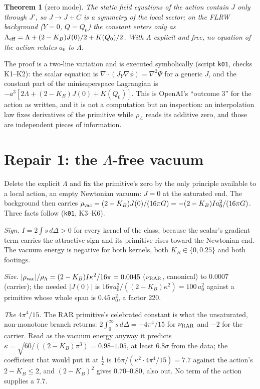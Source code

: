 \documentclass[11pt,letterpaper]{article}
\newtheorem{theorem}{Theorem}
\begin{document}
\begin{theorem}[zero mode]
The static field equations of the action contain $J$ only through $J'$, so $J\to J+C$ is a symmetry of the local sector; on the FLRW background ($Y=0$, $Q=Q_0$) the constant enters only as $\Lambda_{\rm eff}=\Lambda+(2-K_B)J(0)/2+K(Q_0)/2$. With $\Lambda$ explicit and free, no equation of the action relates $a_0$ to $\Lambda$.
\end{theorem}
The proof is a two-line variation and is executed symbolically (script \texttt{k01}, checks K1--K2): the scalar equation is $\nabla\!\cdot\!(J_Y\nabla\phi)=\nabla^2\Psi$ for a generic $J$, and the constant part of the minisuperspace Lagrangian is $-a^3[2\Lambda+(2-K_B)J(0)+K(Q_0)]$. This is OpenAI's ``outcome 3'' for the action as written, and it is not a computation but an inspection: an interpolation law fixes derivatives of the primitive while $\rho_\Lambda$ reads its additive zero, and those are independent pieces of information.

\section{Repair 1: the $\Lambda$-free vacuum}
Delete the explicit $\Lambda$ and fix the primitive's zero by the only principle available to a local action, an empty Newtonian vacuum: $J=0$ at the saturated end. The background then carries $\rho_{\rm vac}=(2-K_B)J(0)/(16\pi G)=-(2-K_B)Ia_0^2/(16\pi G)$. Three facts follow (\texttt{k01}, K3--K6).

\emph{Sign.} $I=2\int s\,d\Delta>0$ for every kernel of the class, because the scalar's gradient term carries the attractive sign and its primitive rises toward the Newtonian end. The vacuum energy is negative for both kernels, both $K_B\in\{0,0.25\}$ and both footings.

\emph{Size.} $|\rho_{\rm vac}|/\rho_\Lambda=(2-K_B)I\kappa^2/16\pi=0.0045$ ($\nu_{\rm RAR}$, canonical) to $0.0007$ (carrier); the needed $|J(0)|$ is $16\pi a_0^2/((2-K_B)\kappa^2)=100\,a_0^2$ against a primitive whose whole span is $0.45\,a_0^2$, a factor 220.

\emph{The $4\pi^4/15$.} The RAR primitive's celebrated constant is what the unsaturated, non-monotone branch returns: $2\int_0^\infty s\,d\Delta=-4\pi^4/15$ for $\nu_{\rm RAR}$ and $-2$ for the carrier. Read as the vacuum energy anyway it predicts $\kappa=\sqrt{60/((2-K_B)\pi^3)}=0.98$--$1.05$, at least $6.8\sigma$ from the data; the coefficient that would put it at $\tfrac12$ is $16\pi/(\kappa^2\cdot4\pi^4/15)=7.7$ against the action's $2-K_B\le2$, and $(2-K_B)^2$ gives $0.70$--$0.80$, also out. No term of the action supplies a 7.7.
\end{document}
